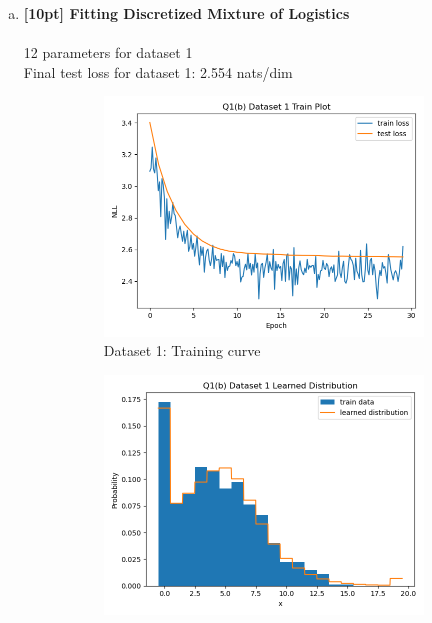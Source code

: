 \documentclass{article}
\begin{document}
\begin{enumerate}[(a)]
\newpage

\item {\bf [10pt] Fitting Discretized Mixture of Logistics} \\\\
12 parameters for dataset 1 \\
Final test loss for dataset 1: 2.554 nats/dim
\begin{figure}[H]
    \centering
    \begin{subfigure}{0.45\textwidth}
        \centering
        \includegraphics[width=\textwidth]{figures/q1_b_dset1_train_plot.png}
        \caption{Dataset 1: Training curve}
    \end{subfigure}
    \hspace{0.2in}
    \begin{subfigure}{0.45\textwidth}
        \centering
        \includegraphics[width=\textwidth]{figures/q1_b_dset1_learned_dist.png}

\end{subfigure}
\end{figure}
\end{enumerate}
\end{document}
